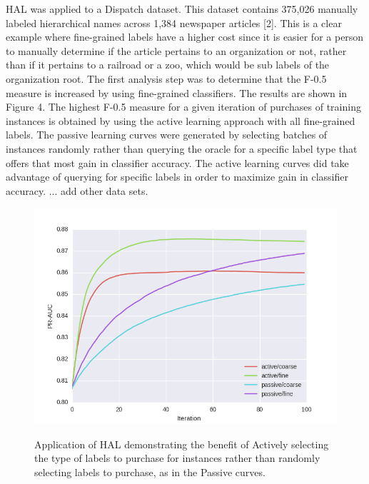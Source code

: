 \documentclass[ms]{nuthesis}
\begin{document}
\par HAL was applied to a Dispatch dataset. This dataset contains 375,026 manually labeled
hierarchical names across 1,384 newspaper articles [2]. This is a clear example where
fine-grained labels have a higher cost since it is easier for a person to manually
determine if the article pertains to an organization or not, rather than if it pertains
to a railroad or a zoo, which would be sub labels of the organization root. The first
analysis step was to determine that the F-0.5 measure is increased by using fine-grained classifiers.
The results are shown in Figure 4. The highest F-0.5 measure for
a given iteration of purchases of training instances is obtained by using the active
learning approach with all fine-grained labels. The passive learning curves were
 generated by selecting batches of instances randomly rather than querying the
 oracle for a specific label type that offers that most gain in classifier accuracy.
 The active learning curves did take advantage of querying for specific labels in
 order to maximize gain in classifier accuracy. ... add other data sets.

\FloatBarrier
\begin{figure}[!htb]
	\centering
    \includegraphics[width=1.0\columnwidth]{fig/draft-RCV1}
    \label{fig:draft-RCV1}
    \caption{Application of HAL demonstrating the benefit of Actively selecting the type
    of labels to purchase for instances rather than randomly selecting labels to purchase,
    as in the Passive curves.}
\end{figure}
\FloatBarrier
\end{document}
